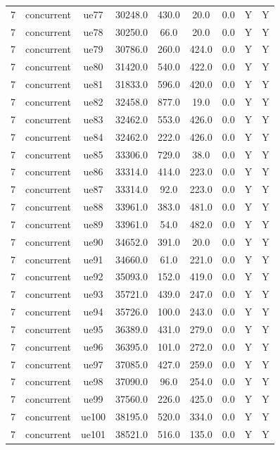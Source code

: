 \begin{table}[ht]
\begin{tabular}{|c|c|c|c|c|c|c|c|c|}
7 & concurrent & ue77 & 30248.0 & 430.0 & 20.0 & 0.0 & Y & Y \\
7 & concurrent & ue78 & 30250.0 & 66.0 & 20.0 & 0.0 & Y & Y \\
7 & concurrent & ue79 & 30786.0 & 260.0 & 424.0 & 0.0 & Y & Y \\
7 & concurrent & ue80 & 31420.0 & 540.0 & 422.0 & 0.0 & Y & Y \\
7 & concurrent & ue81 & 31833.0 & 596.0 & 420.0 & 0.0 & Y & Y \\
7 & concurrent & ue82 & 32458.0 & 877.0 & 19.0 & 0.0 & Y & Y \\
7 & concurrent & ue83 & 32462.0 & 553.0 & 426.0 & 0.0 & Y & Y \\
7 & concurrent & ue84 & 32462.0 & 222.0 & 426.0 & 0.0 & Y & Y \\
7 & concurrent & ue85 & 33306.0 & 729.0 & 38.0 & 0.0 & Y & Y \\
7 & concurrent & ue86 & 33314.0 & 414.0 & 223.0 & 0.0 & Y & Y \\
7 & concurrent & ue87 & 33314.0 & 92.0 & 223.0 & 0.0 & Y & Y \\
7 & concurrent & ue88 & 33961.0 & 383.0 & 481.0 & 0.0 & Y & Y \\
7 & concurrent & ue89 & 33961.0 & 54.0 & 482.0 & 0.0 & Y & Y \\
7 & concurrent & ue90 & 34652.0 & 391.0 & 20.0 & 0.0 & Y & Y \\
7 & concurrent & ue91 & 34660.0 & 61.0 & 221.0 & 0.0 & Y & Y \\
7 & concurrent & ue92 & 35093.0 & 152.0 & 419.0 & 0.0 & Y & Y \\
7 & concurrent & ue93 & 35721.0 & 439.0 & 247.0 & 0.0 & Y & Y \\
7 & concurrent & ue94 & 35726.0 & 100.0 & 243.0 & 0.0 & Y & Y \\
7 & concurrent & ue95 & 36389.0 & 431.0 & 279.0 & 0.0 & Y & Y \\
7 & concurrent & ue96 & 36395.0 & 101.0 & 272.0 & 0.0 & Y & Y \\
7 & concurrent & ue97 & 37085.0 & 427.0 & 259.0 & 0.0 & Y & Y \\
7 & concurrent & ue98 & 37090.0 & 96.0 & 254.0 & 0.0 & Y & Y \\
7 & concurrent & ue99 & 37560.0 & 226.0 & 425.0 & 0.0 & Y & Y \\
7 & concurrent & ue100 & 38195.0 & 520.0 & 334.0 & 0.0 & Y & Y \\
7 & concurrent & ue101 & 38521.0 & 516.0 & 135.0 & 0.0 & Y & Y \\

\end{tabular}
\end{table}
